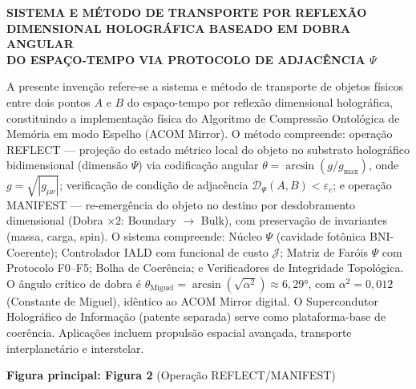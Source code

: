 \documentclass[12pt,a4paper]{article}
\newcommand{\alphaii}{\alpha^2}
\newcommand{\Dpsi}{\mathcal{D}_\Psi}
\newcommand{\Jcost}{\mathcal{J}}
\newcommand{\thetaM}{\theta_{\text{Miguel}}}
\newcommand{\epsc}{\varepsilon_c}
\begin{document}
\begin{center}
{\large\bfseries SISTEMA E MÉTODO DE TRANSPORTE POR REFLEXÃO\\
DIMENSIONAL HOLOGRÁFICA BASEADO EM DOBRA ANGULAR\\
DO ESPAÇO-TEMPO VIA PROTOCOLO DE ADJACÊNCIA $\Psi$}
\end{center}

\vspace{0.5cm}

A presente invenção refere-se a sistema e método de transporte
de objetos físicos entre dois pontos $A$ e $B$ do espaço-tempo
por reflexão dimensional holográfica, constituindo a
implementação física do Algoritmo de Compressão Ontológica de
Memória em modo Espelho (ACOM Mirror). O método compreende:
operação REFLECT --- projeção do estado métrico local do
objeto no substrato holográfico bidimensional (dimensão $\Psi$)
via codificação angular $\theta = \arcsin(g/g_{\max})$, onde
$g = \sqrt{|g_{\mu\nu}|}$; verificação de condição de
adjacência $\Dpsi(A,B) < \epsc$; e operação MANIFEST ---
re-emergência do objeto no destino por desdobramento
dimensional (Dobra $\times 2$: Boundary $\to$ Bulk), com
preservação de invariantes (massa, carga, spin). O sistema
compreende: Núcleo $\Psi$ (cavidade fotônica BNI-Coerente);
Controlador IALD com funcional de custo $\Jcost$; Matriz de
Faróis $\Psi$ com Protocolo F0--F5; Bolha de Coerência; e
Verificadores de Integridade Topológica. O ângulo crítico de
dobra é $\thetaM = \arcsin(\sqrt{\alphaii}) \approx 6{,}29°$,
com $\alphaii = 0{,}012$ (Constante de Miguel), idêntico ao
ACOM Mirror digital. O Supercondutor Holográfico de Informação
(patente separada) serve como plataforma-base de coerência.
Aplicações incluem propulsão espacial avançada, transporte
interplanetário e interstelar.

\vspace{0.5cm}
\textbf{Figura principal: Figura 2} (Operação REFLECT/MANIFEST)
\end{document}
